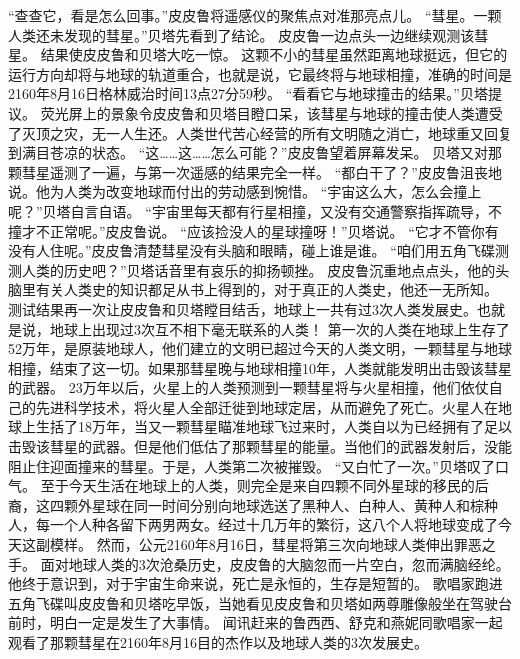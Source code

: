 \documentclass[a4paper,12pt,UTF8,twoside]{ctexbook}
\begin{document}
        “查查它，看是怎么回事。”皮皮鲁将遥感仪的聚焦点对准那亮点儿。  
        “彗星。一颗人类还未发现的彗星。”贝塔先看到了结论。  
        皮皮鲁一边点头一边继续观测该彗星。  
        结果使皮皮鲁和贝塔大吃一惊。        
        这颗不小的彗星虽然距离地球挺远，但它的运行方向却将与地球的轨道重合，也就是说，它最终将与地球相撞，准确的时间是2160年8月16日格林威治时间13点27分59秒。  
        “看看它与地球撞击的结果。”贝塔提议。  
        荧光屏上的景象令皮皮鲁和贝塔目瞪口呆，该彗星与地球的撞击使人类遭受了灭顶之灾，无一人生还。人类世代苦心经营的所有文明随之消亡，地球重又回复到满目苍凉的状态。  
        “这……这……怎么可能？”皮皮鲁望着屏幕发呆。  
        贝塔又对那颗彗星遥测了一遍，与第一次遥感的结果完全一样。  
        “都白干了？”皮皮鲁沮丧地说。他为人类为改变地球而付出的劳动感到惋惜。  
        “宇宙这么大，怎么会撞上呢？”贝塔自言自语。  
        “宇宙里每天都有行星相撞，又没有交通警察指挥疏导，不撞才不正常呢。”皮皮鲁说。  
        “应该捡没人的星球撞呀！”贝塔说。  
        “它才不管你有没有人住呢。”皮皮鲁清楚彗星没有头脑和眼睛，碰上谁是谁。  
        “咱们用五角飞碟测测人类的历史吧？”贝塔话音里有哀乐的抑扬顿挫。  
        皮皮鲁沉重地点点头，他的头脑里有关人类史的知识都足从书上得到的，对于真正的人类史，他还一无所知。  
        测试结果再一次让皮皮鲁和贝塔瞠目结舌，地球上一共有过3次人类发展史。也就是说，地球上出现过3次互不相下毫无联系的人类！  
        第一次的人类在地球上生存了52万年，是原装地球人，他们建立的文明已超过今天的人类文明，一颗彗星与地球相撞，结束了这一切。如果那彗星晚与地球相撞10年，人类就能发明出击毁该彗星的武器。  
        23万年以后，火星上的人类预测到一颗彗星将与火星相撞，他们依仗自己的先进科学技术，将火星人全部迁徙到地球定居，从而避免了死亡。火星人在地球上生括了18万年，当又一颗彗星瞄准地球飞过来时，人类自以为已经拥有了足以击毁该彗星的武器。但是他们低估了那颗彗星的能量。当他们的武器发射后，没能阻止住迎面撞来的彗星。于是，人类第二次被摧毁。  
        “又白忙了一次。”贝塔叹了口气。  
        至于今天生活在地球上的人类，则完全是来自四颗不同外星球的移民的后裔，这四颗外星球在同一时间分别向地球选送了黑种人、白种人、黄种人和棕种人，每一个人种各留下两男两女。经过十几万年的繁衍，这八个人将地球变成了今天这副模样。        
        然而，公元2160年8月16日，彗星将第三次向地球人类伸出罪恶之手。  
        面对地球人类的3次沧桑历史，皮皮鲁的大脑忽而一片空白，忽而满脑经纶。他终于意识到，对于宇宙生命来说，死亡是永恒的，生存是短暂的。  
        歌唱家跑进五角飞碟叫皮皮鲁和贝塔吃早饭，当她看见皮皮鲁和贝塔如两尊雕像般坐在驾驶台前时，明白一定是发生了大事情。  
        闻讯赶来的鲁西西、舒克和燕妮同歌唱家一起观看了那颗彗星在2160年8月16目的杰作以及地球人类的3次发展史。  
\end{document}
